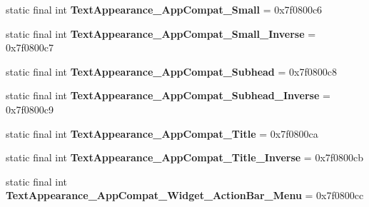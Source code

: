 \begin{DoxyCompactItemize}
\item 
\hypertarget{classandroid_1_1support_1_1v7_1_1appcompat_1_1_r_1_1style_a2f18b3bec0af714ec2cbe27b8dc88310}{}static final int {\bfseries Text\+Appearance\+\_\+\+App\+Compat\+\_\+\+Small} = 0x7f0800c6\label{classandroid_1_1support_1_1v7_1_1appcompat_1_1_r_1_1style_a2f18b3bec0af714ec2cbe27b8dc88310}

\item 
\hypertarget{classandroid_1_1support_1_1v7_1_1appcompat_1_1_r_1_1style_a3c7b4f535d06f2b882bc1bf42cbccea7}{}static final int {\bfseries Text\+Appearance\+\_\+\+App\+Compat\+\_\+\+Small\+\_\+\+Inverse} = 0x7f0800c7\label{classandroid_1_1support_1_1v7_1_1appcompat_1_1_r_1_1style_a3c7b4f535d06f2b882bc1bf42cbccea7}

\item 
\hypertarget{classandroid_1_1support_1_1v7_1_1appcompat_1_1_r_1_1style_a898c904d8860090b71256fea299d0331}{}static final int {\bfseries Text\+Appearance\+\_\+\+App\+Compat\+\_\+\+Subhead} = 0x7f0800c8\label{classandroid_1_1support_1_1v7_1_1appcompat_1_1_r_1_1style_a898c904d8860090b71256fea299d0331}

\item 
\hypertarget{classandroid_1_1support_1_1v7_1_1appcompat_1_1_r_1_1style_ad5e427783ecc5b5eb78038cc5e29ecc8}{}static final int {\bfseries Text\+Appearance\+\_\+\+App\+Compat\+\_\+\+Subhead\+\_\+\+Inverse} = 0x7f0800c9\label{classandroid_1_1support_1_1v7_1_1appcompat_1_1_r_1_1style_ad5e427783ecc5b5eb78038cc5e29ecc8}

\item 
\hypertarget{classandroid_1_1support_1_1v7_1_1appcompat_1_1_r_1_1style_a673070a66526923c44e85b82bfeed62d}{}static final int {\bfseries Text\+Appearance\+\_\+\+App\+Compat\+\_\+\+Title} = 0x7f0800ca\label{classandroid_1_1support_1_1v7_1_1appcompat_1_1_r_1_1style_a673070a66526923c44e85b82bfeed62d}

\item 
\hypertarget{classandroid_1_1support_1_1v7_1_1appcompat_1_1_r_1_1style_a53b6dccae2ab8fbf4a64fa6e8b3e4952}{}static final int {\bfseries Text\+Appearance\+\_\+\+App\+Compat\+\_\+\+Title\+\_\+\+Inverse} = 0x7f0800cb\label{classandroid_1_1support_1_1v7_1_1appcompat_1_1_r_1_1style_a53b6dccae2ab8fbf4a64fa6e8b3e4952}

\item 
\hypertarget{classandroid_1_1support_1_1v7_1_1appcompat_1_1_r_1_1style_a42bd18afa75f3029cd3cba58b6dbbd97}{}static final int {\bfseries Text\+Appearance\+\_\+\+App\+Compat\+\_\+\+Widget\+\_\+\+Action\+Bar\+\_\+\+Menu} = 0x7f0800cc\label{classandroid_1_1support_1_1v7_1_1appcompat_1_1_r_1_1style_a42bd18afa75f3029cd3cba58b6dbbd97}


\end{DoxyCompactItemize}
